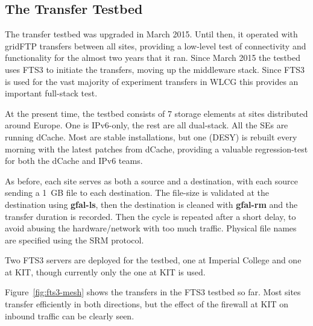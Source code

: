 \subsection{The Transfer Testbed}
The transfer testbed was upgraded in March 2015. Until then, it operated with gridFTP transfers between all sites, providing a low-level test of connectivity and functionality for the almost two years that it ran. Since March 2015 the testbed uses FTS3 \cite{Ayllon2014} to initiate the transfers, moving up the middleware stack. Since FTS3 is used for the vast majority of experiment transfers in WLCG this provides an important full-stack test.

At the present time, the testbed consists of 7 storage elements at sites distributed around Europe. One is IPv6-only, the rest are all dual-stack. All the SEs are running dCache. Most are stable installations, but one (DESY) is rebuilt every morning with the latest patches from dCache, providing a valuable regression-test for both the dCache and IPv6 teams.

As before, each site serves as both a source and a destination, with each source sending a 1~GB file to each destination. The file-size is validated at the destination using {\bf gfal-ls}, then the destination is cleaned with {\bf gfal-rm} and the transfer duration is recorded. Then the cycle is repeated after a short delay, to avoid abusing the hardware/network with too much traffic. Physical file names are specified using the SRM protocol.

Two FTS3 servers are deployed for the testbed, one at Imperial College and one at KIT, though currently only the one at KIT is used.

Figure~\ref{fig:fts3-mesh} shows the transfers in the FTS3 testbed so far. Most sites transfer efficiently in both directions, but the effect of the firewall at KIT on inbound traffic can be clearly seen.

